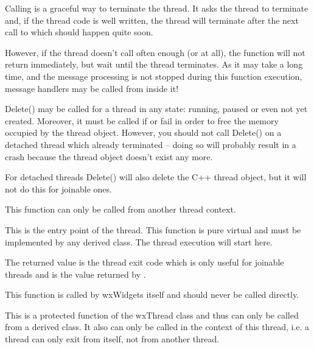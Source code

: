\label{wxthreaddelete}


Calling  is a graceful way to terminate the
thread. It asks the thread to terminate and, if the thread code is well
written, the thread will terminate after the next call to 
 which should happen quite soon.

However, if the thread doesn't call 
often enough (or at all), the function will not return immediately, but wait
until the thread terminates. As it may take a long time, and the message processing
is not stopped during this function execution, message handlers may be
called from inside it!

Delete() may be called for a thread in any state: running, paused or even not
yet created. Moreover, it must be called if  or
 fail in order to free the memory occupied by the
thread object. However, you should not call Delete() on a detached thread which
already terminated -- doing so will probably result in a crash because the
thread object doesn't exist any more.

For detached threads Delete() will also delete the C++ thread object, but it
will not do this for joinable ones.

This function can only be called from another thread context.


\label{wxthreadentry}


This is the entry point of the thread. This function is pure virtual and must
be implemented by any derived class. The thread execution will start here.

The returned value is the thread exit code which is only useful for
joinable threads and is the value returned by .

This function is called by wxWidgets itself and should never be called
directly.


\label{wxthreadexit}


This is a protected function of the wxThread class and thus can only be called
from a derived class. It also can only be called in the context of this
thread, i.e. a thread can only exit from itself, not from another thread.

